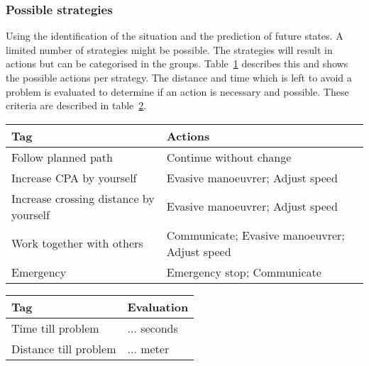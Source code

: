 \subsubsection{Possible strategies}
Using the identification of the situation and the prediction of future states. A limited number of strategies might be possible. The strategies will result in actions but can be categorised in the groups. Table~\ref{tab:strategies} describes this and shows the possible actions per strategy. The distance and time which is left to avoid a problem is evaluated to determine if an action is necessary and possible. These criteria are described in table~\ref{tab:manoeuvre-criteria}.
\begin{table}[H]
	\begin{tabular}{p{}|p{}}
		\toprule
		Tag & Actions \\
		\midrule
		Follow planned path & Continue without change\\
		Increase CPA by yourself & Evasive manoeuvrer; Adjust speed \\
		Increase crossing distance by yourself & Evasive manoeuvrer; Adjust speed \\
		Work together with others & Communicate; Evasive manoeuvrer; Adjust speed \\
		Emergency & Emergency stop; Communicate \\
		\bottomrule
	\end{tabular}
	
	\label{tab:strategies}
\end{table}

\begin{table}[H]
	\begin{tabular}{p{}|p{}}
		\toprule
		Tag & Evaluation \\
		\midrule
		Time till problem & ... seconds\\
		Distance till problem & ... meter \\
		\bottomrule
	\end{tabular}
	
	\label{tab:manoeuvre-criteria}
\end{table}

